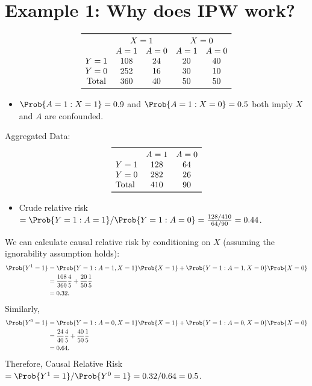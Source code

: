 \documentclass[oneside]{book}\usepackage[]{graphicx}\usepackage[svgnames]{xcolor}
\providecommand\given{} %
\renewcommand\given{\nonscript\:\delimsize\vert\nonscript\:\mathopen{}}%
\renewcommand\given{\nonscript\:\delimsize\vert\nonscript\:\mathopen{}}%
\renewcommand\given{\nonscript\:\delimsize\vert\nonscript\:\mathopen{}}%
\renewcommand\given{\nonscript\:\delimsize\vert\nonscript\:\mathopen{}}%
\renewcommand\given{\nonscript\:\delimsize\vert\nonscript\:\mathopen{}}%
\renewcommand\given{\nonscript\:\delimsize\vert\nonscript\:\mathopen{}}%
\renewcommand\given{\nonscript\:\delimsize\vert\nonscript\:\mathopen{}}%
\renewcommand\given{\nonscript\:\delimsize\vert\nonscript\:\mathopen{}}%
\renewcommand\given{\nonscript\:\delimsize\vert\nonscript\:\mathopen{}}%
\renewcommand\given{\nonscript\:\delimsize\vert\nonscript\:\mathopen{}}%
\renewcommand\given{\nonscript\:\delimsize\vert\nonscript\:\mathopen{}}%
\renewcommand\given{\nonscript\:\delimsize\vert\nonscript\:\mathopen{}}%
\renewcommand\given{\nonscript\:\delimsize\vert\nonscript\:\mathopen{}}%
\renewcommand\given{\nonscript\:\delimsize\vert\nonscript\:\mathopen{}}%
\renewcommand\given{:}
\begin{document}
\section{Example 1: Why does IPW work?}
\[ \begin{array}{ccccc}
            \toprule
                         & \multicolumn{2}{c}{X=1} & \multicolumn{2}{c}{X=0}             \\
                         & A=1                     & A=0                     & A=1 & A=0 \\
            Y=1          & 108                     & 24                      & 20  & 40  \\
            Y=0          & 252                     & 16                      & 30  & 10  \\
            \text{Total} & 360                     & 40                      & 50  & 50  \\
            \bottomrule
      \end{array} \]
\begin{itemize}
      \item $ \Prob{A=1\given X=1}=0.9 $ and $ \Prob{A=1\given X=0}=0.5 $ both imply
            $ X $ and $ A $ are confounded.
\end{itemize}
Aggregated Data:
\[ \begin{array}{lcc}
            \toprule
                         & A=1 & A=0 \\
            Y=1          & 128 & 64  \\
            Y=0          & 282 & 26  \\
            \text{Total} & 410 & 90  \\
            \bottomrule
      \end{array} \]
\begin{itemize}
      \item Crude relative risk $ =\Prob{Y=1\given A=1}/\Prob{Y=1\given A=0}=\frac{128/410}{64/90}=0.44 $.
\end{itemize}
We can calculate causal relative risk by conditioning on $X$
(assuming the ignorability assumption holds):
\begin{align*}
      \Prob{Y^1=1}
       & =\Prob{Y=1\given A=1,X=1}\Prob{X=1}+\Prob{Y=1\given A=1,X=0}\Prob{X=0} \\
       & =\frac{108}{360}\frac{4}{5}+\frac{20}{50}\frac{1}{5}                   \\
       & =0.32.
\end{align*}
Similarly,
\begin{align*}
      \Prob{Y^0=1}
       & =\Prob{Y=1\given A=0,X=1}\Prob{X=1}+\Prob{Y=1\given A=0,X=0}\Prob{X=0} \\
       & =\frac{24}{40}\frac{4}{5}+\frac{40}{50}\frac{1}{5}                     \\
       & =0.64.
\end{align*}
Therefore, Causal Relative Risk $=\Prob{Y^1=1}/\Prob{Y^0=1}=0.32/0.64=0.5$.
\end{document}
